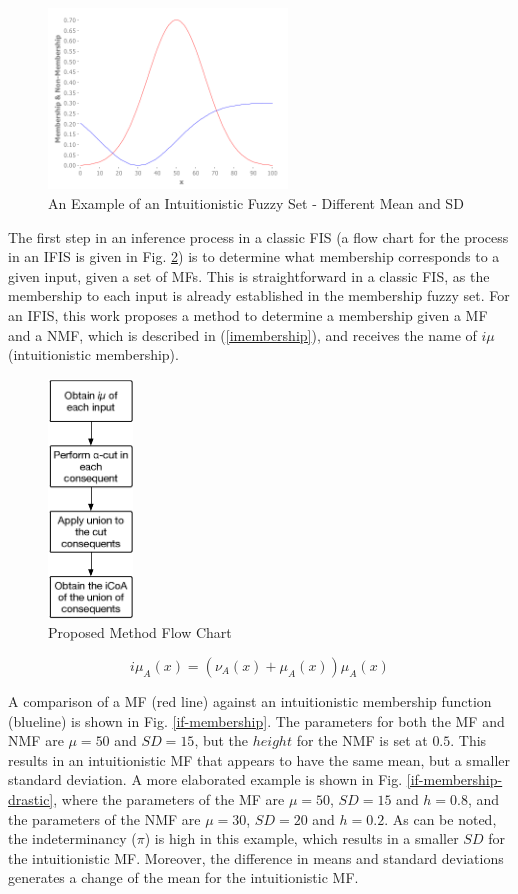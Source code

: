 \documentclass[conference]{IEEEtran}
\begin{document}
\begin{figure}[!t]
  \centering
  \includegraphics[width=2.5in]{ifs-diff-mu-sd}
  \caption{An Example of an Intuitionistic Fuzzy Set - Different Mean
    and SD}
  \label{ifs-diff-mu-sd}
\end{figure}

The first step in an inference process in a classic FIS (a flow chart
for the process in an IFIS is given in Fig. \ref{flow-chart}) is to
determine what membership corresponds to a given input, given a set of
MFs. This is straightforward in a classic FIS, as the
membership to each input is already established in the membership
fuzzy set. For an IFIS, this work proposes a method to determine a
membership given a MF and a NMF,
which is described in (\ref{imembership}), and receives the name of
$i\mu$ (intuitionistic membership).

\begin{figure}[!t]
  \centering
  \includegraphics[height=2.5in]{proposed-method-flow-chart}
  \caption{Proposed Method Flow Chart}
  \label{flow-chart}
\end{figure}

\begin{equation}
  \label{imembership}
  i\mu_{A}(x) = (\nu_{A}(x) + \mu_{A}(x))\mu_{A}(x)
\end{equation}

A comparison of a MF (red line) against an intuitionistic
membership function (blueline) is shown in Fig.
\ref{if-membership}. The parameters for both the MF and NMF are $\mu =
50$ and $SD = 15$, but the $height$ for the NMF is set at $0.5$. This
results in an intuitionistic MF that appears to have the same mean,
but a smaller standard deviation. A more elaborated example is shown
in Fig. \ref{if-membership-drastic}, where the parameters of the MF
are $\mu = 50$, $SD = 15$ and $h = 0.8$, and the parameters of the NMF
are $\mu = 30$, $SD = 20$ and $h = 0.2$. As can be noted, the
indeterminancy ($\pi$) is high in this example, which results in a
smaller $SD$ for the intuitionistic MF. Moreover, the difference in
means and standard deviations generates a change of the mean for the
intuitionistic MF.
\end{document}
